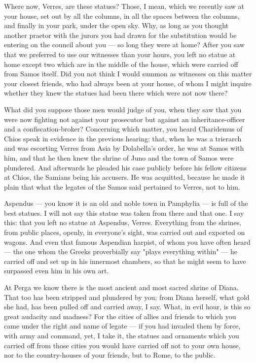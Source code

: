  Where now, Verres, are these statues? Those, I mean, which we recently saw at your house, set out by all the columns, in all the spaces between the columns, and finally in your park, under the open sky. Why, as long as you thought another praetor with the jurors you had drawn for the substitution would be entering on the council about you --- so long they were at home? After you saw that we preferred to use our witnesses than your hours, you left no statue at home except two which are in the middle of the house, which were carried off from Samos itself. Did you not think I would summon as witnesses on this matter your closest friends, who had always been at your house, of whom I might inquire whether they knew the statues had been there which were not now there?

 What did you suppose those men would judge of you, when they saw that you were now fighting not against your prosecutor but against an inheritance-officer and a confiscation-broker? Concerning which matter, you heard Charidemus of Chios speak in evidence in the previous hearing: that, when he was a trierarch and was escorting Verres from Asia by Dolabella's order, he was at Samos with him, and that he then knew the shrine of Juno and the town of Samos were plundered. And afterwards he pleaded his case publicly before his fellow citizens at Chios, the Samians being his accusers. He was acquitted, because he made it plain that what the legates of the Samos said pertained to Verres, not to him.

 Aspendus --- you know it is an old and noble town in Pamphylia --- is full of the best statues. I will not say this statue was taken from there and that one. I say this: that you left no statue at Aspendus, Verres. Everything from the shrines, from public places, openly, in everyone's sight, was carried out and exported on wagons. And even that famous Aspendian harpist, of whom you have often heard --- the one whom the Greeks proverbially say "plays everything within" --- he carried off and set up in his innermost chambers, so that he might seem to have surpassed even him in his own art.

 At Perga we know there is the most ancient and most sacred shrine of Diana. That too has been stripped and plundered by you; from Diana herself, what gold she had, has been pulled off and carried away, I say. What, in evil hour, is this so great audacity and madness? For the cities of allies and friends to which you came under the right and name of legate --- if you had invaded them by force, with army and command, yet, I take it, the statues and ornaments which you carried off from those cities you would have carried off not to your own house, nor to the country-houses of your friends, but to Rome, to the public.

